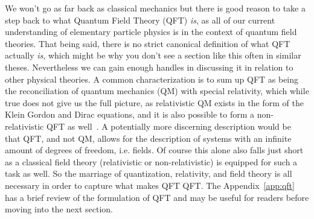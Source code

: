 We won't go as far back as classical mechanics but there is good reason to take a step back to what Quantum Field Theory (QFT) \emph{is}, as all of our current understanding of elementary particle physics is in the context of quantum field theories. 
That being said, there is no strict canonical definition of what QFT actually \emph{is}, which might be why you don't see a section like this often in similar theses.
Nevertheless we can gain enough handles in discussing it in relation to other physical theories.
A common characterization is to sum up QFT as being the reconciliation of quantum mechanics (QM) with special relativity, which while true does not give us the full picture, as relativistic QM exists in the form of the Klein Gordon and Dirac equations, and it is also possible to form a non-relativistic QFT as well~\cite{Bain:2011}.
A potentially more discerning description would be that QFT, and not QM, allows for the description of systems with an infinite amount of degrees of freedom, i.e. fields.
Of course this alone also falls just short as a classical field theory (relativistic or non-relativistic) is equipped for such a task as well.
So the marriage of quantization, relativity, and field theory is all necessary in order to capture what makes QFT QFT.
The Appendix~\ref{app:qft} has a brief review of the formulation of QFT and may be useful for readers before moving into the next section.

